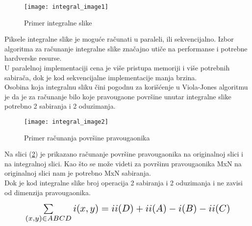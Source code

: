 \begin{figure}[h]
  \centering
  \texttt{[image: integral\_image1]}
  \caption{Primer integralne slike}
  \label{IntegralImage_img1}
\end{figure}

Piksele integralne slike je moguće računati u paraleli, ili
sekvencijalno. Izbor algoritma za računanje integralne slike značajno utiče na
performanse i potrebne hardverske resurse. \\
U paralelnoj implementaciji cena je
više pristupa memoriji i više potrebnih sabirača, dok je kod sekvencijalne
implementacije manja brzina. \\

Osobina koja integralnu sliku čini pogodnu za korišćenje u Viola-Jones algoritmu
je da je za računanje bilo koje pravougaone površine unutar integralne slike
potrebno 2 sabiranja i 2 oduzimanja.

\begin{figure}[h]
  \centering
  \texttt{[image: integral\_image2]}
  \caption{Primer računanja površine pravougaonika}
  \label{IntegralImage_img2}
\end{figure}

Na slici (\ref{IntegralImage_img2}) je prikazano računanje površine pravougaonika na
originalnoj slici i na integralnoj slici.
Kao što se može videti za površinu pravougaonika MxN na originalnoj slici nam je
potrebno MxN sabiranja. \\
Dok je kod integralne slike broj operacija 2 sabiranja i 2
oduzimanja i ne zavisi od dimenzija pravougaonika.

\begin{equation}
  \Scale[1.4]{\sum\limits_{(x,y)\in ABCD} i(x,y)=ii(D)+ii(A)-i(B)-ii(C)}
  \label{IntegralImage_eq2}
\end{equation}